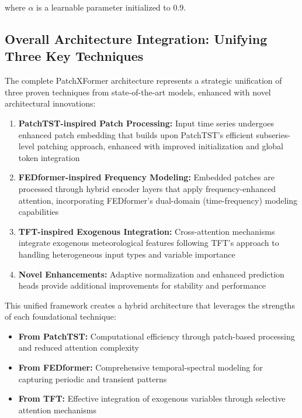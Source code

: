 \documentclass[12pt]{uomthesis}
\begin{document}
where $\alpha$ is a learnable parameter initialized to 0.9.

\subsection{Overall Architecture Integration: Unifying Three Key Techniques}

The complete PatchXFormer architecture represents a strategic unification of three proven techniques from state-of-the-art models, enhanced with novel architectural innovations:

\begin{enumerate}
\item \textbf{PatchTST-inspired Patch Processing:} Input time series undergoes enhanced patch embedding that builds upon PatchTST's efficient subseries-level patching approach, enhanced with improved initialization and global token integration

\item \textbf{FEDformer-inspired Frequency Modeling:} Embedded patches are processed through hybrid encoder layers that apply frequency-enhanced attention, incorporating FEDformer's dual-domain (time-frequency) modeling capabilities

\item \textbf{TFT-inspired Exogenous Integration:} Cross-attention mechanisms integrate exogenous meteorological features following TFT's approach to handling heterogeneous input types and variable importance

\item \textbf{Novel Enhancements:} Adaptive normalization and enhanced prediction heads provide additional improvements for stability and performance
\end{enumerate}

This unified framework creates a hybrid architecture that leverages the strengths of each foundational technique:
\begin{itemize}
\item \textbf{From PatchTST:} Computational efficiency through patch-based processing and reduced attention complexity
\item \textbf{From FEDformer:} Comprehensive temporal-spectral modeling for capturing periodic and transient patterns
\item \textbf{From TFT:} Effective integration of exogenous variables through selective attention mechanisms
\end{itemize}
\end{document}
